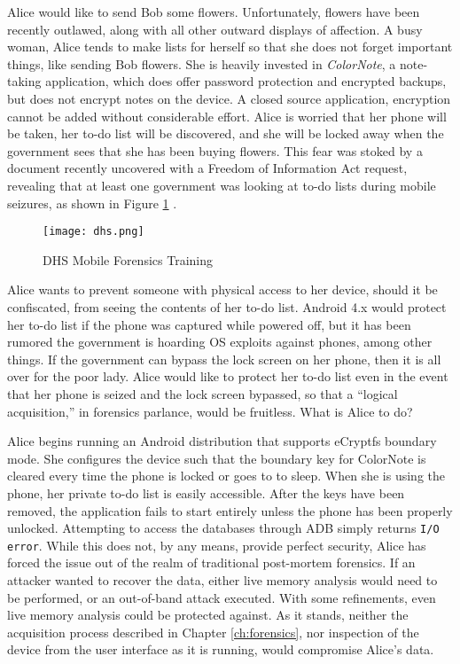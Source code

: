 Alice would like to send Bob some flowers. Unfortunately, flowers have been recently outlawed, along with all other outward displays
of affection. A busy woman, Alice tends to make lists for herself so that she does not forget important things, like sending Bob
flowers. She is heavily invested in \emph{ColorNote}, a note-taking application, which does offer password protection and encrypted
backups, but does not encrypt notes on the device. A closed source application, encryption cannot be added without considerable
effort. Alice is worried that her phone will be taken, her to-do list will be discovered, and she will be locked away when the
government sees that she has been buying flowers. This fear was stoked by a document recently uncovered with a Freedom of
Information Act request, revealing that at least one government was looking at to-do lists during mobile seizures, as shown in
Figure \ref{fig:dhs} \cite{dhsfoia}. 
\begin{figure}[!h]
\begin{center}
\texttt{[image: dhs.png]}
\end{center}
\caption{DHS Mobile Forensics Training} 
\label{fig:dhs}
\end{figure}
Alice wants to prevent someone with physical access to her device, should it be confiscated,
from seeing the contents of her to-do list. Android 4.x would protect her to-do list if the phone was captured while powered off, but
it has been rumored the government is hoarding OS exploits against phones, among other things. If the government can bypass the lock
screen on her phone, then it is all over for the poor lady. Alice would like to protect her to-do list even in the event that her
phone is seized and the lock screen bypassed, so that a ``logical acquisition,'' in forensics parlance, would be fruitless.
What is Alice to do?


Alice begins running an Android distribution that supports eCryptfs boundary mode. She configures the device such that the boundary
key for ColorNote is cleared every time the phone is locked or goes to to sleep. When she is using the phone, her private to-do list
is easily accessible. After the keys have been removed, the application fails to start entirely unless the phone has been properly
unlocked. Attempting to access the databases through ADB simply returns \texttt{I/O error}. While this does not, by any means,
provide perfect security, Alice has forced the issue out of the realm of traditional post-mortem forensics. If an attacker wanted to
recover the data, either live memory analysis would need to be performed, or an out-of-band attack executed. With some refinements,
even live memory analysis could be protected against.  As it stands, neither the acquisition process described in Chapter
\ref{ch:forensics}, nor inspection of the device from the user interface as it is running, would compromise Alice's data.
